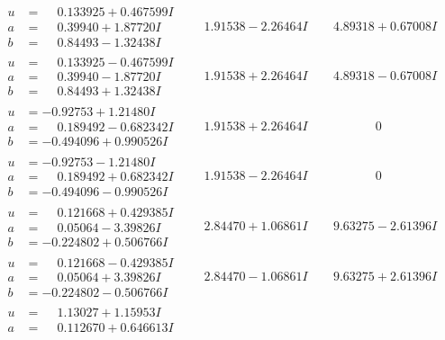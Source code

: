 \documentclass[1p]{elsarticle_modified}
\theoremstyle{definition}
\begin{document}
$$\begin{array}{c|c|c}
\begin{aligned}
u &= \phantom{-}0.133925 + 0.467599 I \\
a &= \phantom{-}0.39940 + 1.87720 I \\
b &= \phantom{-}0.84493 - 1.32438 I\end{aligned}
 & \phantom{-}1.91538 - 2.26464 I & \phantom{-}4.89318 + 0.67008 I \\ \hline\begin{aligned}
u &= \phantom{-}0.133925 - 0.467599 I \\
a &= \phantom{-}0.39940 - 1.87720 I \\
b &= \phantom{-}0.84493 + 1.32438 I\end{aligned}
 & \phantom{-}1.91538 + 2.26464 I & \phantom{-}4.89318 - 0.67008 I \\ \hline\begin{aligned}
u &= -0.92753 + 1.21480 I \\
a &= \phantom{-}0.189492 - 0.682342 I \\
b &= -0.494096 + 0.990526 I\end{aligned}
 & \phantom{-}1.91538 + 2.26464 I & \phantom{-0.000000 } 0 \\ \hline\begin{aligned}
u &= -0.92753 - 1.21480 I \\
a &= \phantom{-}0.189492 + 0.682342 I \\
b &= -0.494096 - 0.990526 I\end{aligned}
 & \phantom{-}1.91538 - 2.26464 I & \phantom{-0.000000 } 0 \\ \hline\begin{aligned}
u &= \phantom{-}0.121668 + 0.429385 I \\
a &= \phantom{-}0.05064 - 3.39826 I \\
b &= -0.224802 + 0.506766 I\end{aligned}
 & \phantom{-}2.84470 + 1.06861 I & \phantom{-}9.63275 - 2.61396 I \\ \hline\begin{aligned}
u &= \phantom{-}0.121668 - 0.429385 I \\
a &= \phantom{-}0.05064 + 3.39826 I \\
b &= -0.224802 - 0.506766 I\end{aligned}
 & \phantom{-}2.84470 - 1.06861 I & \phantom{-}9.63275 + 2.61396 I \\ \hline\begin{aligned}
u &= \phantom{-}1.13027 + 1.15953 I \\
a &= \phantom{-}0.112670 + 0.646613 I \\

\end{aligned}
\end{array}$$
\end{document}

